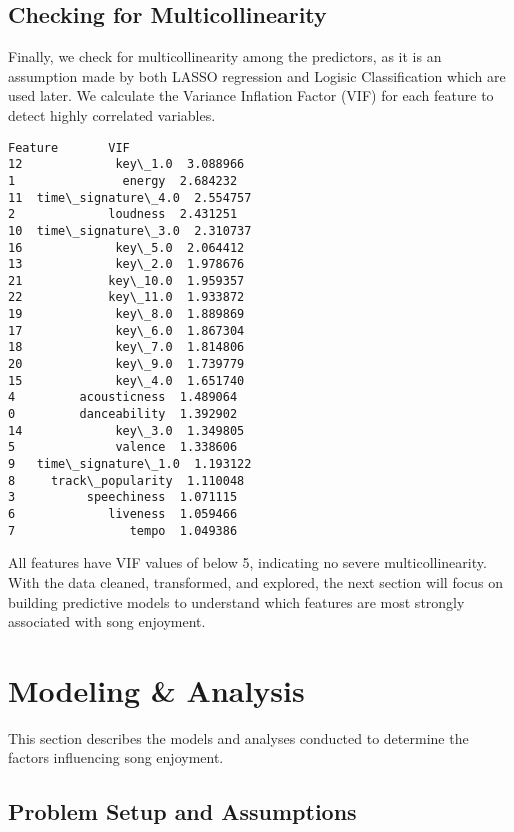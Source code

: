 \documentclass[11pt]{article}
\begin{document}
    \subsection{Checking for
Multicollinearity}\label{checking-for-multicollinearity}

Finally, we check for multicollinearity among the predictors, as it is
an assumption made by both LASSO regression and Logisic Classification
which are used later. We calculate the Variance Inflation Factor (VIF)
for each feature to detect highly correlated variables.

    
    
    \begin{Verbatim}[commandchars=\\\{\}]
               Feature       VIF
12             key\_1.0  3.088966
1               energy  2.684232
11  time\_signature\_4.0  2.554757
2             loudness  2.431251
10  time\_signature\_3.0  2.310737
16             key\_5.0  2.064412
13             key\_2.0  1.978676
21            key\_10.0  1.959357
22            key\_11.0  1.933872
19             key\_8.0  1.889869
17             key\_6.0  1.867304
18             key\_7.0  1.814806
20             key\_9.0  1.739779
15             key\_4.0  1.651740
4         acousticness  1.489064
0         danceability  1.392902
14             key\_3.0  1.349805
5              valence  1.338606
9   time\_signature\_1.0  1.193122
8     track\_popularity  1.110048
3          speechiness  1.071115
6             liveness  1.059466
7                tempo  1.049386
    \end{Verbatim}

    

    All features have VIF values of below 5, indicating no severe
multicollinearity. With the data cleaned, transformed, and explored, the
next section will focus on building predictive models to understand
which features are most strongly associated with song enjoyment.

    \section{Modeling \& Analysis}\label{modeling-analysis}

This section describes the models and analyses conducted to determine
the factors influencing song enjoyment.

\subsection{Problem Setup and
Assumptions}\label{problem-setup-and-assumptions}
\end{document}
